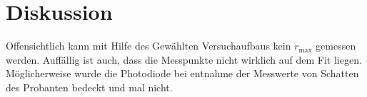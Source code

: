 \section{Diskussion}
\label{sec:Diskussion}
Offensichtlich kann mit Hilfe des Gewählten Versuchaufbaus kein $r_{\text{max}}$ gemessen werden. Auffällig ist auch, dass die Messpunkte nicht wirklich auf dem Fit liegen. Möglicherweise wurde die Photodiode bei entnahme der Messwerte von Schatten des Probanten bedeckt und mal nicht. 

